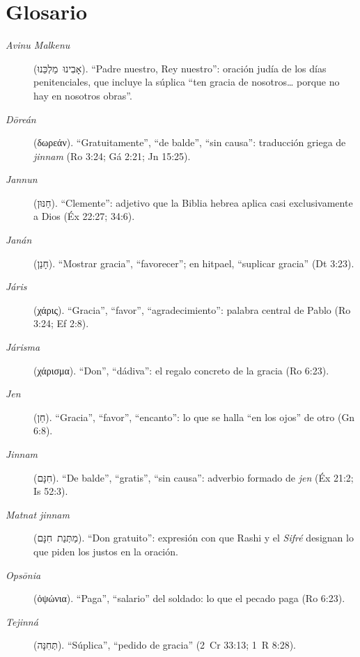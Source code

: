 \documentclass[11pt,letterpaper]{article}
\newcommand{\heb}[1]{\mbox{\foreignlanguage{hebrew}{#1}}}
\newcommand{\grc}[1]{\foreignlanguage{ancientgreek}{#1}}
\begin{document}
\section*{Glosario}
\begin{description}
\item[\emph{Avinu Malkenu}] (\heb{אָבִינוּ מַלְכֵּנוּ}). ``Padre nuestro, Rey nuestro'': oración judía de los días penitenciales, que incluye la súplica ``ten gracia de nosotros\ldots{} porque no hay en nosotros obras''.
\item[\emph{Dōreán}] (\grc{δωρεάν}). ``Gratuitamente'', ``de balde'', ``sin causa'': traducción griega de \emph{jinnam} (Ro 3:24; Gá 2:21; Jn 15:25).
\item[\emph{Jannun}] (\heb{חַנּוּן}). ``Clemente'': adjetivo que la Biblia hebrea aplica casi exclusivamente a Dios (Éx 22:27; 34:6).
\item[\emph{Janán}] (\heb{חָנַן}). ``Mostrar gracia'', ``favorecer''; en hitpael, ``suplicar gracia'' (Dt 3:23).
\item[\emph{Járis}] (\grc{χάρις}). ``Gracia'', ``favor'', ``agradecimiento'': palabra central de Pablo (Ro 3:24; Ef 2:8).
\item[\emph{Járisma}] (\grc{χάρισμα}). ``Don'', ``dádiva'': el regalo concreto de la gracia (Ro 6:23).
\item[\emph{Jen}] (\heb{חֵן}). ``Gracia'', ``favor'', ``encanto'': lo que se halla ``en los ojos'' de otro (Gn 6:8).
\item[\emph{Jinnam}] (\heb{חִנָּם}). ``De balde'', ``gratis'', ``sin causa'': adverbio formado de \emph{jen} (Éx 21:2; Is 52:3).
\item[\emph{Matnat jinnam}] (\heb{מַתְּנַת חִנָּם}). ``Don gratuito'': expresión con que Rashi y el \emph{Sifré} designan lo que piden los justos en la oración.
\item[\emph{Opsōnia}] (\grc{ὀψώνια}). ``Paga'', ``salario'' del soldado: lo que el pecado paga (Ro 6:23).
\item[\emph{Tejinná}] (\heb{תְּחִנָּה}). ``Súplica'', ``pedido de gracia'' (2~Cr 33:13; 1~R 8:28).
\end{description}

\end{document}
